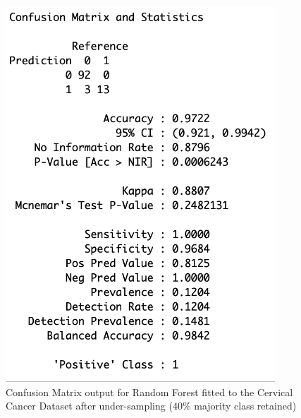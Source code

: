 \begin{figure}[!htbp]
    \centering
    \begin{minipage}{0.45\textwidth}
        \centering
        \includegraphics[width=0.9\textwidth]{ThesisTemplate/appendix/images/Chapter5Appendix/ConfusionMatrix40/CervicalCancer.png}
        \caption{Confusion Matrix output for Random Forest fitted to the Cervical Cancer Dataset after under-sampling (40\% majority class retained)}
        \label{fig:my_label}
    \end{minipage}\hfill
    \begin{minipage}{0.45\textwidth}
        \centering

\end{minipage}
\end{figure}
